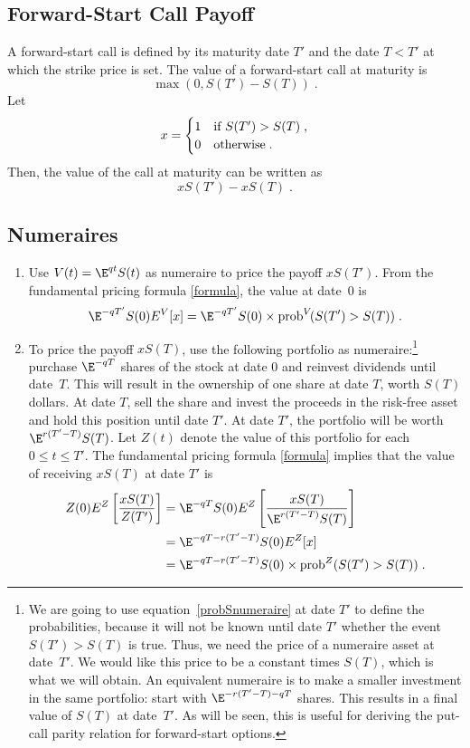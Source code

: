 \subsection*{Forward-Start Call Payoff}

A forward-start call is defined by its maturity date $T'$ and the date $T<T'$ at which the strike price is set.  The value of a forward-start call at maturity is
$$\max(0,S(T')-S(T))\; .$$
Let
$$x= \begin{cases} 1 &\text{if $S(T')>S(T)$\;,}\\
                               0 & \text{otherwise\;.}
        \end{cases}
$$
Then, the value of the call at maturity can be written as 
$$xS(T')-xS(T)\; .$$

\subsection*{Numeraires}
\begin{enumerate}
\item Use $V(t)=\E^{qt}S(t)$ as numeraire to price the payoff $xS(T')$.  From the fundamental pricing formula \eqref{formula}, the value at date~0 is
$$\E^{-qT'}S(0)E^V[x] = \E^{-qT'}S(0)\times \text{prob}^V\!(S(T')>S(T))\; .$$
\item To price the payoff $xS(T)$, use the following portfolio as numeraire:\footnote{We are going to use equation~\eqref{probSnumeraire} at date $T'$ to define the probabilities, because it will not be known until date $T'$ whether the event $S(T')>S(T)$ is true.  Thus, we need the price of a numeraire asset at date~$T'$.  We would like this price to be a constant times $S(T)$, which is what we will obtain.  An equivalent numeraire is to make a smaller investment in the same portfolio: start with $\E^{-r(T'-T)-qT}$ shares.  This results in a final value of $S(T)$ at date~$T'$.  As will be seen, this is useful for deriving the put-call parity relation for forward-start options.\label{forwardstartnote}} purchase $\E^{-qT}$ shares of the stock at date 0 and reinvest dividends until date~$T$.  This will result in the ownership of one share at date $T$, worth $S(T)$ dollars.  At date $T$, sell the share and invest the proceeds in the risk-free asset and hold this position until date $T'$.  At date $T'$, the portfolio will be worth $\E^{r(T'-T)}S(T)$.  Let $Z(t)$ denote the value of this portfolio for each $0\leq t\leq T'$.  The fundamental pricing formula \eqref{formula} implies that the value of receiving $xS(T)$ at date $T'$ is
\begin{align*}
Z(0)E^Z\left[ \frac{xS(T)}{Z(T')}\right] &=
\E^{-qT}S(0)E^Z\left[ \frac{xS(T)}{\E^{r(T'-T)}S(T)}\right]\\&= \E^{-qT-r(T'-T)}S(0)E^Z[x] \\&= \E^{-qT-r(T'-T)}S(0) \times\text{prob}^Z(S(T')>S(T))\;.
\end{align*}
\end{enumerate}


